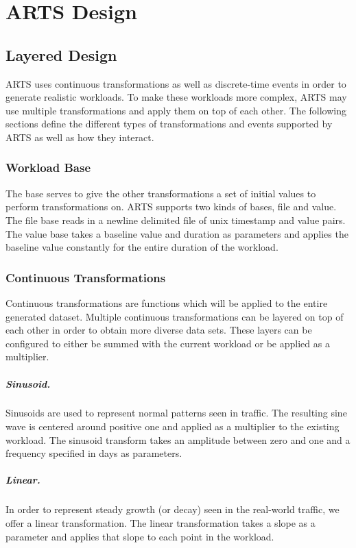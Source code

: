 \chapter{ARTS Design}
\label{ch:arts}

\section{Layered Design}
ARTS uses continuous transformations as well as discrete-time events in order to generate realistic workloads. To make these workloads more complex, ARTS may use multiple transformations and apply them on top of each other. The following sections define the different types of transformations and events supported by ARTS as well as how they interact.

\subsection{Workload Base}
The base serves to give the other transformations a set of initial values to perform transformations on. ARTS supports two kinds of bases, file and value. The file base reads in a newline delimited file of unix timestamp and value pairs. The value base takes a baseline value and duration as parameters and applies the baseline value constantly for the entire duration of the workload.

\subsection{Continuous Transformations}
Continuous transformations are functions which will be applied to the entire generated dataset. Multiple continuous transformations can be layered on top of each other in order to obtain more diverse data sets. These layers can be configured to either be summed with the current workload or be applied as a multiplier.

\paragraph{Sinusoid.} Sinusoids are used to represent normal patterns seen in traffic. The resulting sine wave is centered around positive one and applied as a multiplier to the existing workload. The sinusoid transform takes an amplitude between zero and one and a frequency specified in days as parameters.

\paragraph{Linear.} In order to represent steady growth (or decay) seen in the real-world traffic, we offer a linear transformation. The linear transformation takes a slope as a parameter and applies that slope to each point in the workload.

